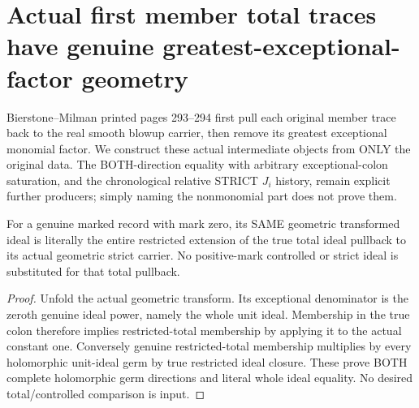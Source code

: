 \section{Actual first member total traces have genuine greatest-exceptional-factor geometry}

Bierstone--Milman printed pages 293--294 first pull each original member trace
back to the real smooth blowup carrier, then remove its greatest exceptional
monomial factor. We construct these actual intermediate objects from ONLY the
original data. The BOTH-direction equality with arbitrary exceptional-colon
saturation, and the chronological relative STRICT $J_i$ history, remain explicit
further producers; simply naming the nonmonomial part does not prove them.

\begin{lemma}
\label{hir:sharp-actual-zero-mark-entire-restricted-total-ideal}
\leanok
For a genuine marked record with mark zero, its SAME geometric transformed
ideal is literally the entire restricted extension of the true total ideal
pullback to its actual geometric strict carrier. No positive-mark controlled
or strict ideal is substituted for that total pullback.
\end{lemma}
\begin{proof}
Unfold the actual geometric transform. Its exceptional denominator is the
zeroth genuine ideal power, namely the whole unit ideal. Membership in the
true colon therefore implies restricted-total membership by applying it to
the actual constant one. Conversely genuine restricted-total membership
multiplies by every holomorphic unit-ideal germ by true restricted ideal
closure. These prove BOTH complete holomorphic germ directions and literal
whole ideal equality. No desired total/controlled comparison is input.
\end{proof}

